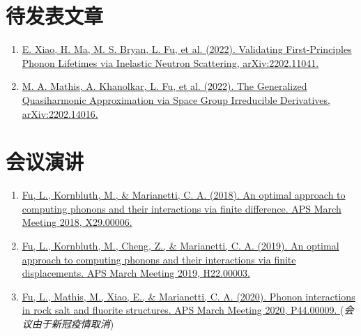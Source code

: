 \documentclass[
  a4paper,
  12pt
]{cv}
\begin{document}
\section{待发表文章}

\begin{enumerate}
\item
\href{https://arxiv.org/abs/2202.11041}{
E. Xiao, H. Ma, M. S. Bryan, \underline{L. Fu}, et al. (2022).
Validating First-Principles Phonon Lifetimes via Inelastic Neutron Scattering,
arXiv:2202.11041.
}

\item
\href{https://arxiv.org/abs/2202.14016}{
M. A. Mathis, A. Khanolkar, \underline{L. Fu}, et al. (2022).
The Generalized Quasiharmonic Approximation via Space Group Irreducible Derivatives,
arXiv:2202.14016.
}
\end{enumerate}


\section{会议演讲}

\begin{enumerate}
\item
\href{https://meetings.aps.org/Meeting/MAR18/Event/322388}{
Fu, L., Kornbluth, M., \& Marianetti, C. A. (2018).
An optimal approach to computing phonons and their interactions via finite difference.
APS March Meeting 2018, X29.00006.
}
%
\item
\href{https://meetings.aps.org/Meeting/MAR19/Session/H22.3}{
Fu, L., Kornbluth, M., Cheng, Z., \& Marianetti, C. A. (2019).
An optimal approach to computing phonons and their interactions via finite displacements.
APS March Meeting 2019, H22.00003.
}
%
\item
\href{https://meetings.aps.org/Meeting/MAR20/Session/P44.9}{
Fu, L., Mathis, M., Xiao, E., \& Marianetti, C. A. (2020).
Phonon interactions in rock salt and fluorite structures.
APS March Meeting 2020, P44.00009.
} (\emph{会议由于新冠疫情取消})
\end{enumerate}
\end{document}
